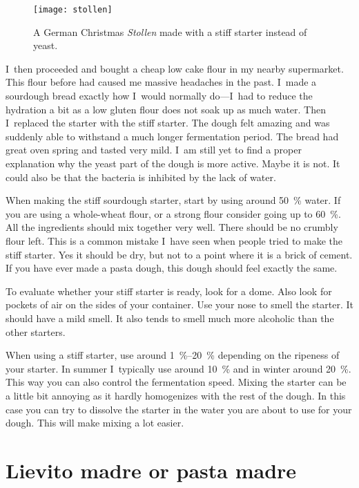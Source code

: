 \begin{figure}[!htb]
  \texttt{[image: stollen]}
  \caption[Christmas \emph{Stollen}]{A German Christmas \emph{Stollen} made
      with a stiff starter instead of yeast.}%
  \label{fig:stollen}
\end{figure}

I~then proceeded and bought a cheap low cake flour in my nearby supermarket.
This flour before had caused me massive headaches in the past. I~made a sourdough bread
exactly how I~would normally do---I~had to reduce the hydration a bit as a low
gluten flour does not soak up as much water. Then I~replaced the starter with
the stiff starter. The dough felt amazing and was suddenly able to withstand a
much longer fermentation period. The bread had great oven spring and tasted
very mild. I~am still yet to find a proper explanation why the yeast part of
the dough is more active. Maybe it is not. It could also be that the bacteria
is inhibited by the lack of water.

When making the stiff sourdough starter, start by using around \qty{50}{\percent}
water. If you are using a whole-wheat flour, or a strong flour consider going
up to \qty{60}{\percent}. All the ingredients should mix together very well. There
should be no crumbly flour left. This is a common mistake I~have seen when
people tried to make the stiff starter. Yes it should be dry, but not to a
point where it is a brick of cement. If you have ever made a pasta dough, this
dough should feel exactly the same.

To evaluate whether your stiff starter is ready, look for a dome. Also look for
pockets of air on the sides of your container. Use your nose to smell the
starter. It should have a mild smell. It also tends to smell much more
alcoholic than the other starters.

When using a stiff starter, use around \qtyrange{1}{20}{\percent} depending on
the ripeness of your starter. In summer I~typically use around
\qty{10}{\percent} and in winter around \qty{20}{\percent}. This way you can
also control the fermentation speed.
Mixing the starter can be a little bit annoying as it hardly homogenizes with
the rest of the dough. In this case you can try to dissolve the starter in the
water you are about to use for your dough. This will make mixing a lot easier.


\section{Lievito madre or pasta madre}

